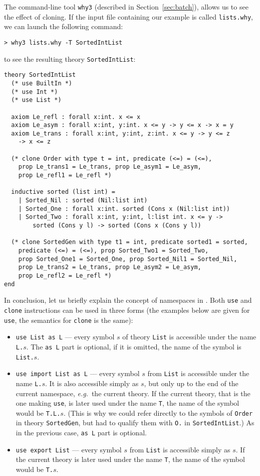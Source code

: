 The command-line tool \texttt{why3} (described in
Section~\ref{sec:batch}), allows us to see the effect of cloning.
If the input file containing our example is called \texttt{lists.why},
we can launch the following command:
\begin{verbatim}
> why3 lists.why -T SortedIntList
\end{verbatim}
to see the resulting theory \texttt{SortedIntList}:
\begin{verbatim}
theory SortedIntList
  (* use BuiltIn *)
  (* use Int *)
  (* use List *)

  axiom Le_refl : forall x:int. x <= x
  axiom Le_asym : forall x:int, y:int. x <= y -> y <= x -> x = y
  axiom Le_trans : forall x:int, y:int, z:int. x <= y -> y <= z
    -> x <= z

  (* clone Order with type t = int, predicate (<=) = (<=),
    prop Le_trans1 = Le_trans, prop Le_asym1 = Le_asym,
    prop Le_refl1 = Le_refl *)

  inductive sorted (list int) =
    | Sorted_Nil : sorted (Nil:list int)
    | Sorted_One : forall x:int. sorted (Cons x (Nil:list int))
    | Sorted_Two : forall x:int, y:int, l:list int. x <= y ->
        sorted (Cons y l) -> sorted (Cons x (Cons y l))

  (* clone SortedGen with type t1 = int, predicate sorted1 = sorted,
    predicate (<=) = (<=), prop Sorted_Two1 = Sorted_Two,
    prop Sorted_One1 = Sorted_One, prop Sorted_Nil1 = Sorted_Nil,
    prop Le_trans2 = Le_trans, prop Le_asym2 = Le_asym,
    prop Le_refl2 = Le_refl *)
end
\end{verbatim}

In conclusion, let us briefly explain the concept of namespaces
in \why. Both \texttt{use} and \texttt{clone} instructions can
be used in three forms (the examples below are given for \texttt{use},
the semantics for \texttt{clone} is the same):
\begin{itemize}
\item \texttt{use List as L} --- every symbol $s$ of theory \texttt{List}
is accessible under the name \texttt{L.$s$}. The \texttt{as L} part is
optional, if it is omitted, the name of the symbol is \texttt{List.$s$}.

\item \texttt{use import List as L} --- every symbol $s$ from
\texttt{List} is accessible under the name \texttt{L.$s$}. It is also
accessible simply as \texttt{$s$}, but only up to the end of the current
namespace, \emph{e.g.}~the current theory. If the current theory, that is the
one making \texttt{use}, is later used under the name \texttt{T},
the name of the symbol would be \texttt{T.L.$s$}. (This is why we
could refer directly to the symbols of \texttt{Order} in theory
\texttt{SortedGen}, but had to qualify them with \texttt{O.}
in \texttt{SortedIntList}.)
As in the previous case, \texttt{as L} part is optional.

\item \texttt{use export List} --- every symbol $s$ from \texttt{List}
is accessible simply as \texttt{$s$}. If the current theory
is later used under the name \texttt{T}, the name of the symbol
would be \texttt{T.$s$}.
\end{itemize}

